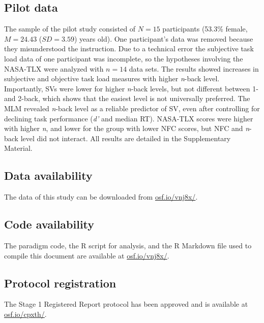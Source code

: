 \documentclass[
  man,floatsintext]{apa6}
\begin{document}
\hypertarget{pilot-data}{%
\subsection{Pilot data}\label{pilot-data}}

The sample of the pilot study consisted of \(N=15\) participants (53.3\% female, \(M=24.43\) (\(SD=3.59\)) years old).
One participant's data was removed because they misunderstood the instruction.
Due to a technical error the subjective task load data of one participant was incomplete, so the hypotheses involving the NASA-TLX were analyzed with \(n=14\) data sets.
The results showed increases in subjective and objective task load measures with higher \emph{n}-back level.
Importantly, SVs were lower for higher \emph{n}-back levels, but not different between 1- and 2-back, which shows that the easiest level is not universally preferred.
The MLM revealed \emph{n}-back level as a reliable predictor of SV, even after controlling for declining task performance (\emph{d'} and median RT).
NASA-TLX scores were higher with higher \emph{n}, and lower for the group with lower NFC scores, but NFC and \emph{n}-back level did not interact.
All results are detailed in the Supplementary Material.

\hypertarget{data-availability}{%
\subsection{Data availability}\label{data-availability}}

The data of this study can be downloaded from \href{https://osf.io/vnj8x/}{osf.io/vnj8x/}.

\hypertarget{code-availability}{%
\subsection{Code availability}\label{code-availability}}

The paradigm code, the R script for analysis, and the R Markdown file used to compile this document are available at \href{https://osf.io/vnj8x/}{osf.io/vnj8x/}.

\hypertarget{protocol-registration}{%
\subsection{Protocol registration}\label{protocol-registration}}

The Stage 1 Registered Report protocol has been approved and is available at \href{https://osf.io/cpxth}{osf.io/cpxth/}.
\end{document}
